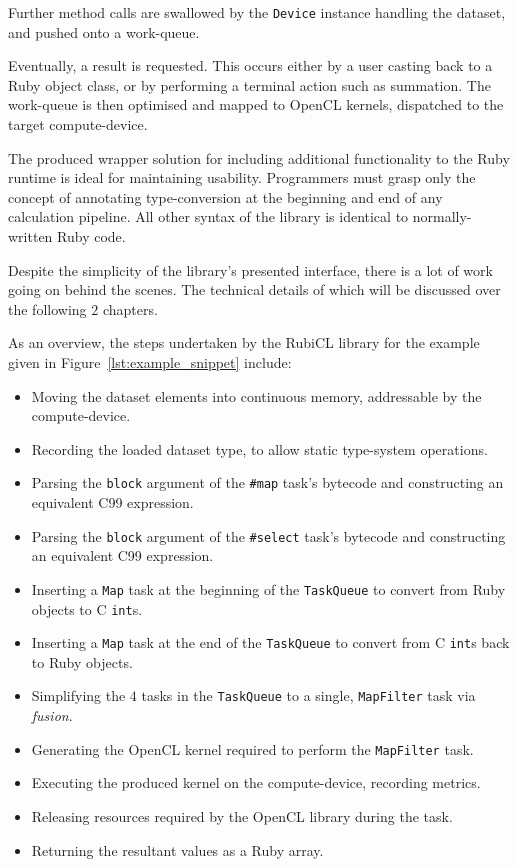 Further method calls are swallowed by the \verb|Device| instance handling the dataset, and pushed onto a work-queue.

Eventually, a result is requested. This occurs either by a user casting back to a Ruby object class, or by performing a terminal action such as summation. The work-queue is then optimised and mapped to OpenCL kernels, dispatched to the target compute-device.

The produced wrapper solution for including additional functionality to the Ruby runtime is ideal for maintaining usability. Programmers must grasp only the concept of annotating type-conversion at the beginning and end of any calculation pipeline. All other syntax of the library is identical to normally-written Ruby code.

Despite the simplicity of the library's presented interface, there is a lot of work going on behind the scenes. The technical details of which will be discussed over the following $2$ chapters.

As an overview, the steps undertaken by the RubiCL library for the example given in Figure~\ref{lst:example_snippet} include:
\begin{itemize}
  \item Moving the dataset elements into continuous memory, addressable by the compute-device.
  \item Recording the loaded dataset type, to allow static type-system operations.
  \item Parsing the \verb|block| argument of the \verb|#map| task's bytecode and constructing an equivalent C99 expression.
  \item Parsing the \verb|block| argument of the \verb|#select| task's bytecode and constructing an equivalent C99 expression.
  \item Inserting a \verb|Map| task at the beginning of the \verb|TaskQueue| to convert from Ruby objects to C \verb|int|s.
  \item Inserting a \verb|Map| task at the end of the \verb|TaskQueue| to convert from C \verb|int|s back to Ruby objects.
  \item Simplifying the $4$ tasks in the \verb|TaskQueue| to a single, \verb|MapFilter| task via \emph{fusion}.
  \item Generating the OpenCL kernel required to perform the \verb|MapFilter| task.
  \item Executing the produced kernel on the compute-device, recording metrics.
  \item Releasing resources required by the OpenCL library during the task.
  \item Returning the resultant values as a Ruby array.
\end{itemize}

